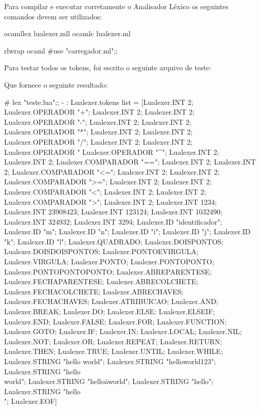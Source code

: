 \documentclass[12pt,a4paper,twoside]{report}
\begin{document}
Para compilar e executar corretamente o Analisador Léxico os seguintes comandos devem ser utilizados:

\begin{terminal}
ocamllex lualexer.mll
ocamlc lualexer.ml

rlwrap ocaml
#use "carregador.ml";;
\end{terminal}

Para testar todos os tokens, foi escrito o seguinte arquivo de teste:



Que fornece o seguinte resultado:

\begin{terminal}
# lex "teste.lua";;
- : Lualexer.tokens list =
[Lualexer.INT 2; Lualexer.OPERADOR "+"; Lualexer.INT 2; Lualexer.INT 2;
 Lualexer.OPERADOR "-"; Lualexer.INT 2; Lualexer.INT 2;
 Lualexer.OPERADOR "*"; Lualexer.INT 2; Lualexer.INT 2;
 Lualexer.OPERADOR "/"; Lualexer.INT 2; Lualexer.INT 2;
 Lualexer.OPERADOR "%
 Lualexer.OPERADOR "^"; Lualexer.INT 2; Lualexer.INT 2;
 Lualexer.COMPARADOR "=="; Lualexer.INT 2; Lualexer.INT 2;
 Lualexer.COMPARADOR "<="; Lualexer.INT 2; Lualexer.INT 2;
 Lualexer.COMPARADOR ">="; Lualexer.INT 2; Lualexer.INT 2;
 Lualexer.COMPARADOR "<"; Lualexer.INT 2; Lualexer.INT 2;
 Lualexer.COMPARADOR ">"; Lualexer.INT 2; Lualexer.INT 1234;
 Lualexer.INT 23908423; Lualexer.INT 123124; Lualexer.INT 1032490;
 Lualexer.INT 324932; Lualexer.INT 3294; Lualexer.ID "identificador";
 Lualexer.ID "m"; Lualexer.ID "n"; Lualexer.ID "i"; Lualexer.ID "j";
 Lualexer.ID "k"; Lualexer.ID "l"; Lualexer.QUADRADO; Lualexer.DOISPONTOS;
 Lualexer.DOISDOISPONTOS; Lualexer.PONTOEVIRGULA; Lualexer.VIRGULA;
 Lualexer.PONTO; Lualexer.PONTOPONTO; Lualexer.PONTOPONTOPONTO;
 Lualexer.ABREPARENTESE; Lualexer.FECHAPARENTESE; Lualexer.ABRECOLCHETE;
 Lualexer.FECHACOLCHETE; Lualexer.ABRECHAVES; Lualexer.FECHACHAVES;
 Lualexer.ATRIBUICAO; Lualexer.AND; Lualexer.BREAK; Lualexer.DO;
 Lualexer.ELSE; Lualexer.ELSEIF; Lualexer.END; Lualexer.FALSE; Lualexer.FOR;
 Lualexer.FUNCTION; Lualexer.GOTO; Lualexer.IF; Lualexer.IN; Lualexer.LOCAL;
 Lualexer.NIL; Lualexer.NOT; Lualexer.OR; Lualexer.REPEAT; Lualexer.RETURN;
 Lualexer.THEN; Lualexer.TRUE; Lualexer.UNTIL; Lualexer.WHILE;
 Lualexer.STRING "hello world"; Lualexer.STRING "helloworld123";
 Lualexer.STRING "hello\\world"; Lualexer.STRING "hello\"aworld";
 Lualexer.STRING "hello\nworld"; Lualexer.STRING "hello\\\nworld";
 Lualexer.EOF]
\end{terminal}
\end{document}
